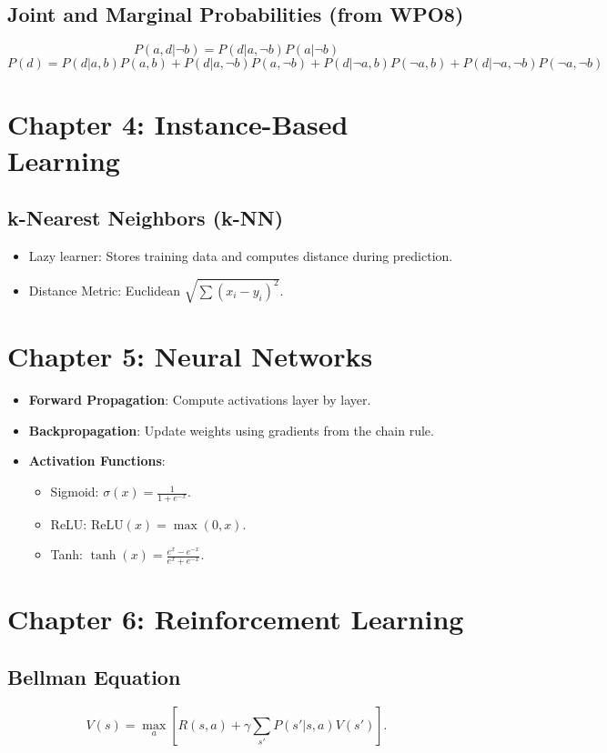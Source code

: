\documentclass[10pt,a4paper]{article}
\begin{document}
\subsection*{Joint and Marginal Probabilities (from WPO8)}
\[
P(a, d|\neg b) = P(d|a, \neg b)P(a|\neg b)
\]
\[
P(d) = P(d|a, b)P(a, b) + P(d|a, \neg b)P(a, \neg b) + P(d|\neg a, b)P(\neg a, b) + P(d|\neg a, \neg b)P(\neg a, \neg b)
\]

\section*{Chapter 4: Instance-Based Learning}
\subsection*{k-Nearest Neighbors (k-NN)}
\begin{itemize}
    \item Lazy learner: Stores training data and computes distance during prediction.
    \item Distance Metric: Euclidean \( \sqrt{\sum (x_i - y_i)^2} \).
\end{itemize}

\section*{Chapter 5: Neural Networks}
\begin{itemize}
    \item \textbf{Forward Propagation}: Compute activations layer by layer.
    \item \textbf{Backpropagation}: Update weights using gradients from the chain rule.
    \item \textbf{Activation Functions}:
    \begin{itemize}
        \item Sigmoid: \( \sigma(x) = \frac{1}{1 + e^{-x}} \).
        \item ReLU: \( \text{ReLU}(x) = \max(0, x) \).
        \item Tanh: \( \tanh(x) = \frac{e^x - e^{-x}}{e^x + e^{-x}} \).
    \end{itemize}
\end{itemize}

\section*{Chapter 6: Reinforcement Learning}
\subsection*{Bellman Equation}
\[
V(s) = \max_a \left[ R(s, a) + \gamma \sum_{s'} P(s'|s, a)V(s') \right].
\]
\end{document}
